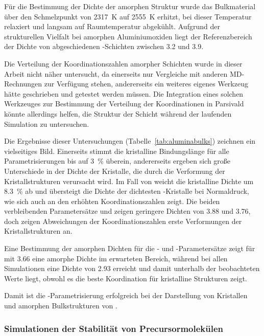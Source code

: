 Für die Bestimmung der Dichte der amorphen Struktur wurde das Bulkmaterial über den Schmelzpunkt von \SI{2317}{\kelvin} auf \SI{2555}{\kelvin} erhitzt, bei dieser Temperatur relaxiert und langsam auf Raumtemperatur abgekühlt.
Aufgrund der strukturellen Vielfalt bei amorphen Aluminiumoxiden liegt der Referenzbereich der Dichte von abgeschiedenen -Schichten zwischen \SI{3.2}{\gpcc} und \SI{3.9}{\gpcc}\cite{wang_dependence_1997}.

Die Verteilung der Koordinationszahlen amorpher Schichten wurde in dieser Arbeit nicht näher untersucht, da einerseits nur Vergleiche mit anderen MD-Rechnungen zur Verfügung stehen\cite{gutierrez_molecular_2002}, andererseits ein weiteres eigenes Werkzeug hätte geschrieben und getestet werden müssen.
Die Integration eines solchen Werkzeuges zur Bestimmung der Verteilung der Koordinationen in Parsivald könnte allerdings helfen, die Struktur der Schicht während der laufenden Simulation zu untersuchen.

Die Ergebnisse dieser Untersuchungen (Tabelle~\ref{tab:aluminabulks}) zeichnen ein vielseitiges Bild.
Einerseits stimmt die kristalline Bindungslänge für alle Parametrisierungen bis auf \SI{3}{\percent} überein, andererseits ergeben sich große Unterschiede in der Dichte der Kristalle, die durch die Verformung der Kristallstrukturen verursacht wird.
Im Fall von  weicht die kristalline Dichte um \SI{+8.3}{\percent} ab und übersteigt die Dichte der dichtesten -Kristalle bei Normaldruck, wie sich auch an den erhöhten Koordinationszahlen zeigt.
Die beiden verbleibenden Parametersätze  und  zeigen geringere Dichten von \SI{3.88}{\gpcc} und \SI{3.76}{\gpcc}, doch zeigen Abweichungen der Koordinationszahlen erste Verformungen der Kristallstrukturen an.

Eine Bestimmung der amorphen Dichten für die - und -Parametersätze zeigt für  mit \SI{3.66}{\gpcc} eine amorphe Dichte im erwarteten Bereich, während  bei allen Simulationen eine Dichte von \SI{2.93}{\gpcc} erreicht und damit unterhalb der beobachteten Werte liegt, obwohl es die beste Koordination für kristalline Strukturen zeigt.

Damit ist die -Parametrisierung erfolgreich bei der Darstellung von Kristallen und amorphen Bulkstrukturen von .

\subsubsection{Simulationen der Stabilität von Precursormolekülen}

